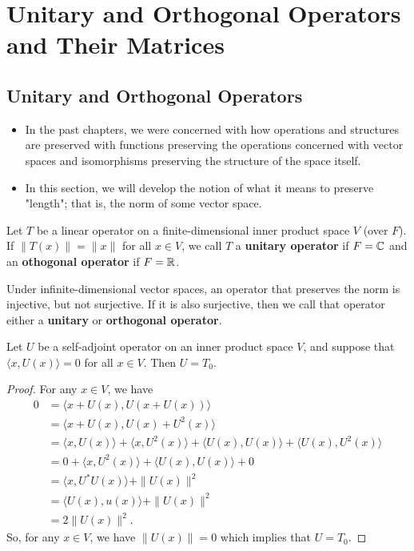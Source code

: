 \section{Unitary and Orthogonal Operators and Their Matrices}

\subsection{Unitary and Orthogonal Operators}

\begin{itemize}
    \item In the past chapters, we were concerned with how operations and structures are preserved with functions preserving the operations concerned with vector spaces and isomorphisms preserving the structure of the space itself. 
    \item In this section, we will develop the notion of what it means to preserve "length"; that is, the norm of some vector space.
\end{itemize}

\begin{definition}
    Let \( T  \) be a linear operator on a finite-dimensional inner product space \( V  \) (over \( F  \)). If \( \|T(x)\| = \|x\| \) for all \( x \in V  \), we call \( T  \) a \textbf{unitary operator} if \( F = \mathbb{C}  \) and an \textbf{othogonal operator} if \( F = \mathbb{R}  \).
\end{definition}

\begin{remark}
    Under infinite-dimensional vector spaces, an operator that preserves the norm is injective, but not surjective. If it is also surjective, then we call that operator either a \textbf{unitary} or \textbf{orthogonal operator}. 
\end{remark}

\begin{lemma}
    Let \( U  \) be a self-adjoint operator on an inner product space \( V  \), and suppose that \( \langle x  , U(x) \rangle = 0  \) for all \( x \in V  \). Then \( U = {T}_{0} \).
\end{lemma}
\begin{proof}
For any \( x \in V  \), we have
\begin{align*}
    0 &= \langle x + U(x) , U(x + U(x)) \rangle \\
      &= \langle x + U(x)  , U(x) + U^{2}(x) \rangle \\
      &= \langle  x  , U(x) \rangle + \langle x  , U^{2}(x) \rangle + \langle U(x) , U(x) \rangle + \langle U(x) , U^{2}(x) \rangle \\
      &= 0 + \langle x  , U^{2}(x) \rangle + \langle U(x) , U(x) \rangle + 0 \\
      &= \langle x  , U^{*}U(x) \rangle + \|U(x)\|^{2} \\
      &= \langle U(x) , u(x) \rangle + \|U(x)\|^{2} \\
      &= 2\|U(x)\|^{2}. 
\end{align*}
So, for any \( x \in V  \), we have \( \|U(x)\| = 0  \) which implies that \( U = {T}_{0} \).
\end{proof}

